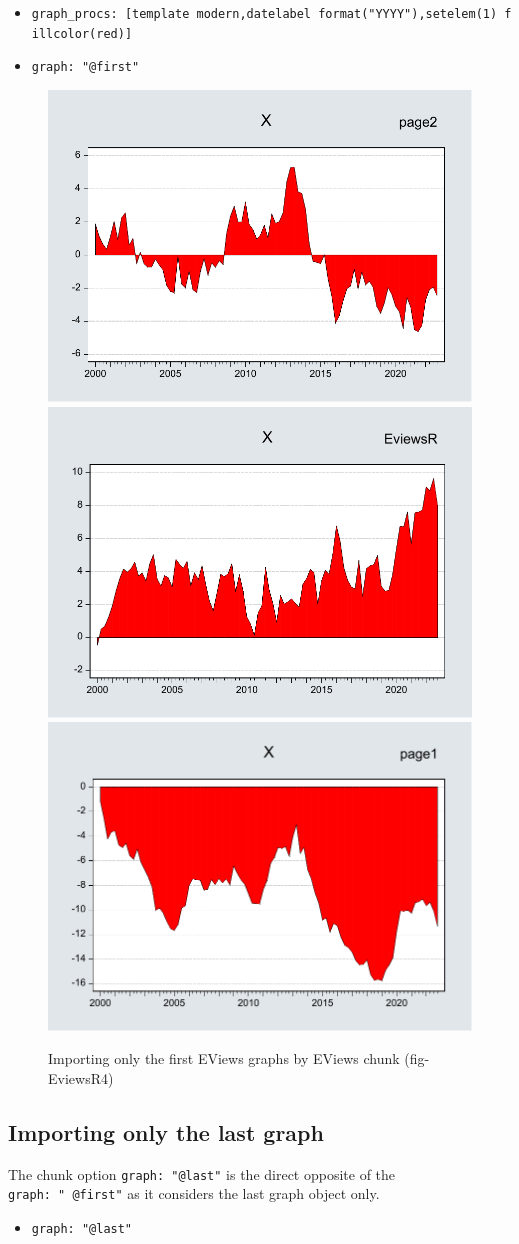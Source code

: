 \begin{itemize}
\item
  \texttt{graph\_procs:\ {[}template\ modern,datelabel\ format("YYYY"),setelem(1)\ fillcolor(red){]}}
\item
  \texttt{graph:\ "@first"}
\end{itemize}

\begin{figure}

{\centering \includegraphics[width=0.32\linewidth,height=0.15\textheight]{figures/eviewsr4page2-graph1} \includegraphics[width=0.32\linewidth,height=0.15\textheight]{figures/eviewsr4eviewsr-graph1} \includegraphics[width=0.32\linewidth,height=0.15\textheight]{figures/eviewsr4page1-graph1} 

}

\caption{Importing only the first EViews graphs by EViews chunk (fig-EviewsR4)}\label{fig:fig-EviewsR4-1}
\end{figure}

\hypertarget{importing-only-the-last-graph}{%
\subsection{Importing only the last graph}\label{importing-only-the-last-graph}}

The chunk option \texttt{graph:\ "@last"} is the direct opposite of the \texttt{graph:\ "\ @first"} as it considers the last graph object only.

\begin{itemize}
\tightlist
\item
  \texttt{graph:\ "@last"}
\end{itemize}

